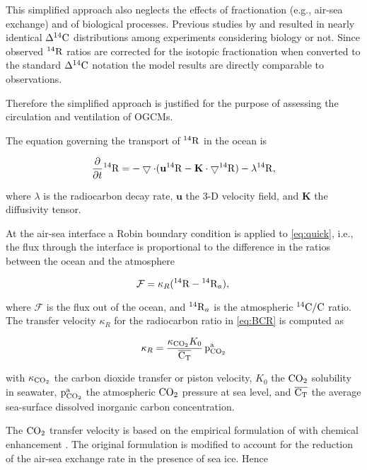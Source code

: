 \documentclass[../main/TOP_manual]{subfiles}
\begin{document}
This simplified approach also neglects the effects of fractionation (e.g.,  air-sea exchange) and of biological processes.
Previous studies by \cite{bacastow_1990} and \cite{joos_1997} resulted in nearly identical $\Delta ^{14}\mathrm{C}$ distributions among experiments considering biology or not.
Since observed $\mathrm{^{14}{R}}$ ratios are corrected for the isotopic fractionation when converted to the standard $\Delta ^{14}\mathrm{C}$ notation \citep{stuiver_1977} the model results are directly comparable to observations.

Therefore the simplified approach is justified for the purpose of assessing the circulation and ventilation of OGCMs.

The equation governing the transport of $\mathrm{^{14}{R}}$  in the ocean is

\begin{equation}
\frac{\partial}{\partial t} {\mathrm{^{14}{R}}} =  - \bigtriangledown \cdot ( \mathbf{u} \mathrm{^{14}{R}} - \mathbf{K} \cdot \bigtriangledown \mathrm{^{14}{R}} )  - \lambda \mathrm{^{14}{R}}, \label{eq:quick}
\end{equation}

where $\lambda$ is the radiocarbon decay rate, ${\mathbf{u}}$ the 3-D velocity field, and $\mathbf{K}$ the diffusivity tensor.

At the air-sea interface a Robin boundary condition \citep{haine_2006} is applied to \autoref{eq:quick}, i.e., the flux
through the interface is proportional to the difference in the ratios between
the ocean and the atmosphere

\begin{equation}
\mathcal{\!F} =  \kappa_{R}  (\mathrm{^{14}{R}}  - \mathrm{^{14}{R}}_{a} ), \label{eq:BCR}
\end{equation}

where $\mathcal{\!F}$ is the flux out of the ocean, and $\mathrm{^{14}{R}}_{a}$ is the atmospheric $\mathrm{^{14}C}/\mathrm{C}$ ratio.
The transfer velocity $ \kappa_{R} $ for the radiocarbon ratio in \autoref{eq:BCR} is computed as

\begin{equation}
 \kappa_{R} =  \frac{\kappa_{\mathrm{CO_2}} K_0}{\overline{\mathrm{C_T}}} \, \mathrm{p^a_{CO_2}}   \label{eq:Rspeed}
\end{equation}

with $\kappa_{\mathrm{CO_2}}$ the carbon dioxide transfer or piston velocity, $K_0$ the $\mathrm{CO_2}$ solubility in seawater, $\mathrm{p^a_{CO_2}}$ the atmospheric $\mathrm{CO_2}$ pressure at sea level, and $\overline{\mathrm{C_T}}$ the average sea-surface dissolved inorganic carbon concentration.

The $\mathrm{CO_2}$ transfer velocity is based on the empirical formulation of \cite{wanninkhof_1992} with chemical enhancement \citep{wanninkhof_1996,wanninkhof_2014}.
The original formulation is modified to account for the reduction of the  air-sea exchange rate in the presence of sea ice.
Hence
\end{document}
